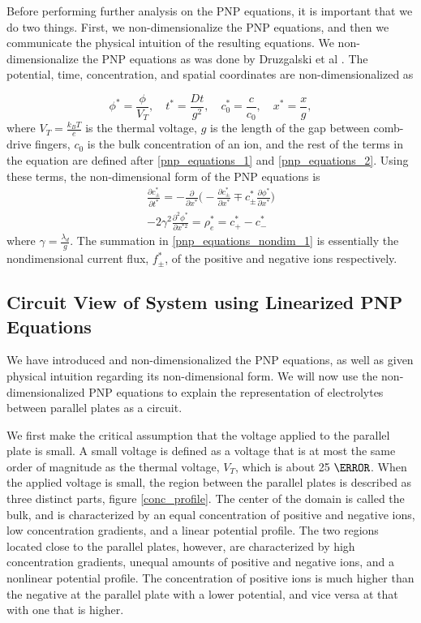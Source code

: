 Before performing further analysis on the PNP equations, it is important that we do two things. First, we non-dimensionalize the PNP equations, and then we communicate the physical intuition of the resulting equations. We non-dimensionalize the PNP equations as was done by Druzgalski et al \cite{Druzgalski2013}. The potential, time, concentration, and spatial coordinates are non-dimensionalized as

\begin{equation}\label{nondim_quants}
    \phi^* = \frac{\phi}{V_T}, \quad t^* = \frac{Dt}{g^2}, \quad  c^*_0 = \frac{c}{c_0}, \quad  x^* = \frac{x}{g},
\end{equation}
where $V_T = \frac{k_B T}{e}$ is the thermal voltage, $g$ is the length of the gap between comb-drive fingers, $c_0$ is the bulk concentration of an ion, and the rest of the terms in the equation are defined after \ref{pnp_equations_1} and \ref{pnp_equations_2}. Using these terms, the non-dimensional form of the PNP equations is
\begin{align}
    \frac{\partial c_\pm^*}{\partial t^*} = - \frac{\partial}{\partial x^*}\bigg(-\frac{\partial c_\pm^*}{\partial x^*} \mp  c_\pm^* \frac{\partial \phi^*}{\partial x^*}\bigg) \label{pnp_equations_nondim_1} \\
    -2 \gamma^2 \frac{\partial^2 \phi^*}{\partial x^{*2}} = \rho_e^* = c_+^* - c_-^* \label{pnp_equations_nondim_2} 
\end{align}
where $\gamma = \frac{\lambda_d}{g}$. The summation in \ref{pnp_equations_nondim_1} is essentially the nondimensional current flux, $f_\pm^*$, of the positive and negative ions respectively.


\subsection{Circuit View of System using Linearized PNP Equations}
We have introduced and non-dimensionalized the PNP equations, as well as given physical intuition regarding its non-dimensional form. We will now use the non-dimensionalized PNP equations to explain the representation of electrolytes between parallel plates as a circuit. 

We first make the critical assumption that the voltage applied to the parallel plate is small. A small voltage is defined as a voltage that is at most the same order of magnitude as the thermal voltage, $V_T$, which is about 25 $\mV$. When the applied voltage is small, the region between the parallel plates is described as three distinct parts, figure \ref{conc_profile}. The center of the domain is called the bulk, and is characterized by an equal concentration of positive and negative ions, low concentration gradients, and a linear potential profile. The two regions located close to the parallel plates, however, are characterized by high concentration gradients, unequal amounts of positive and negative ions, and a nonlinear potential profile. The concentration of positive ions is much higher than the negative at the parallel plate with a lower potential, and vice versa at that with one that is higher. 

